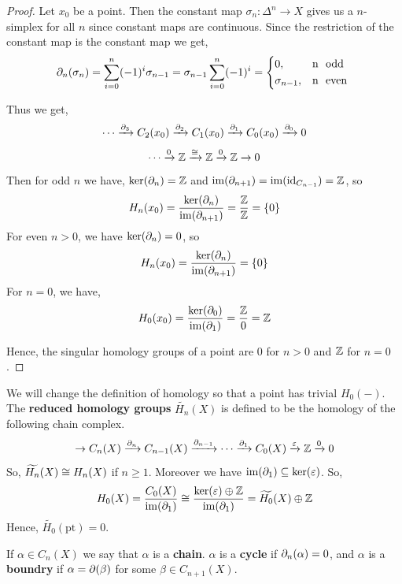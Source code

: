\documentclass[12pt]{amsart}
\begin{document}
\begin{proof}
     Let $x_0$ be a point. Then the constant map $\sigma_n: \Delta^n \to X$ gives us a $n$-simplex for all $n$ since constant maps are continuous. Since the restriction of the constant map is the constant map we get, 
    \[\d_n(\sigma_n) = \sum_{i=0}^n (-1)^i \sigma_{n-1} = \sigma_{n-1} \sum_{i=0}^n (-1)^i = \begin{cases*}
        0 ,& n \text{ odd} \\ 
        \sigma_{n-1}, & n \text{ even} \\ 
    \end{cases*}\]

    Thus we get, 
    \[\cdots \xrightarrow{\partial_3} C_2(x_0) \xrightarrow{\partial_2} C_1(x_0) \xrightarrow{\partial_1} C_0(x_0) \xrightarrow{\partial_0} 0 \]
    \[\cdots \xrightarrow{0} \mathbb Z \xrightarrow{\cong} \mathbb Z \xrightarrow{0} \mathbb Z \xrightarrow{} 0 \]
    Then for odd $n$ we have, 
    $\ker(\partial_n) = \mathbb Z$ and $\operatorname{im}(\partial_{n+1}) = \operatorname{im}(\operatorname{id}_{C_{n-1}}) = \mathbb Z$, so
    \[H_n(x_0) = \frac{\ker(\partial_n)}{\operatorname{im}(\partial_{n+1})} = \frac{\mathbb Z}{\mathbb Z} = \{0\}\]
    For even $n > 0$, we have
    $\ker(\partial_n) = 0$,  so
    \[H_n(x_0) = \frac{\ker(\partial_n)}{\operatorname{im}(\partial_{n+1})} = \{0\}\]
    For $n = 0$, we have,
    \[H_0(x_0) = \frac{\ker(\partial_0)}{\operatorname{im}(\partial_{1})} = \frac{\mathbb Z}{0} = \mathbb Z\]

    Hence, the singular homology groups of a point are $0$ for $n > 0$ and $\mathbb Z$ for $n = 0$. 
\end{proof}

\begin{definition}
    We will change the definition of homology so that a point has trivial $H_0(-)$. The \textbf{reduced homology groups} $\widetilde{H_n}(X)$ is defined to be the homology of the following chain complex. 
    \[\to C_n(X) \xrightarrow{\partial_n} C_{n-1}(X) \xrightarrow{\partial_{n-1}}  \cdots \xrightarrow{\partial_1} C_0(X) \xrightarrow{\varepsilon} \mathbb Z \xrightarrow{0} 0\]
    So, $\widetilde{H_n} (X) \cong H_n(X)$ if $n \geq 1$. Moreover we have $\operatorname{im}(\partial_1) \subseteq \ker(\varepsilon)$. So, 
    \begin{align*}
        H_0(X) = \frac{C_0(X)}{\operatorname{im}(\partial_1)} 
        \cong \frac{\ker(\varepsilon) \oplus \mathbb Z}{ \operatorname{im}(\partial_1)} 
        = \widetilde{H_0}(X) \oplus \mathbb Z
    \end{align*}
    Hence, $\widetilde{H_0}(\text{pt}) =0$. 
\end{definition}

\begin{definition}
    If $\alpha \in C_n(X)$ we say that $\alpha$ is a \textbf{chain}. $\alpha$ is a \textbf{cycle} if $\partial_n(\alpha) = 0$, and $\alpha$ is a \textbf{boundry} if $\alpha = \partial(\beta)$ for some $\beta \in C_{n+1}(X)$. 
\end{definition}
\end{document}
